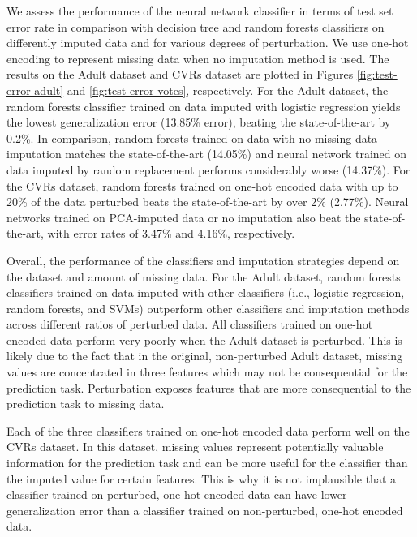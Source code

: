 \documentclass[10pt]{book}
\theoremstyle{definition}
\begin{document}
\par
{}

We assess the performance of the neural network classifier in terms of test set error rate in comparison with decision tree and random forests classifiers on differently imputed data and for various degrees of perturbation.  We use one-hot encoding to represent missing data when no imputation method is used. The results on the Adult dataset and CVRs dataset are plotted in Figures \ref{fig:test-error-adult} and \ref{fig:test-error-votes}, respectively. For the Adult dataset, the random forests classifier trained on data imputed with logistic regression yields the lowest generalization error (13.85\% error), beating the state-of-the-art by 0.2\%. In comparison, random forests trained on data with no missing data imputation matches the state-of-the-art (14.05\%) and neural network trained on data imputed by random replacement performs considerably worse (14.37\%). For the CVRs dataset, random forests trained on one-hot encoded data with up to 20\% of the data perturbed beats the state-of-the-art by over 2\% (2.77\%). Neural networks trained on PCA-imputed data or no imputation also beat the state-of-the-art, with error rates of 3.47\% and 4.16\%, respectively. 

Overall, the performance of the classifiers and imputation strategies depend on the dataset and amount of missing data. For the Adult dataset, random forests classifiers trained on data imputed with other classifiers (i.e., logistic regression, random forests, and SVMs) outperform other classifiers and imputation methods across different ratios of perturbed data. All classifiers trained on one-hot encoded data perform very poorly when the Adult dataset is perturbed. This is likely due to the fact that in the original, non-perturbed Adult dataset, missing values are concentrated in three features which may not be consequential for the prediction task. Perturbation exposes features that are more consequential to the prediction task to missing data. 

Each of the three classifiers trained on one-hot encoded data perform well on the CVRs dataset. In this dataset, missing values represent potentially valuable information for the prediction task and can be more useful for the classifier than the imputed value for certain features. This is why it is not implausible that a classifier trained on perturbed, one-hot encoded data can have lower generalization error than a classifier trained on non-perturbed, one-hot encoded data. 
\end{document}
